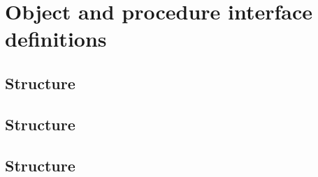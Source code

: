 \chapter{Object and procedure interface definitions}
\label{app:object_and_interface_definition}


\clearpage
\section{\Fhdr{} Structure}
\label{sec:Fhdr_structure}


\clearpage












\clearpage
\section{\Phdr{} Structure}
\label{sec:Phdr_structure}


\clearpage













\newpage
\section{\Panel{} Structure}
\label{sec:Panel_structure}


\clearpage








